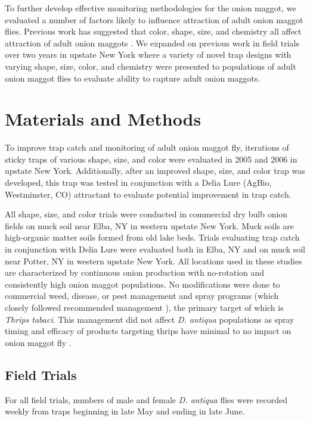 \documentclass[alpha-refs]{wiley-article}
\begin{document}
To further develop effective monitoring methodologies for the onion maggot, we evaluated a number of factors likely to influence attraction of adult onion maggot flies.  Previous work has suggested that color, shape, size, and chemistry all affect attraction of adult onion maggots \citep{harris1983color,harris1988host, thomingdeveloping, otto2000development}. We expanded on previous work in field trials over two years in upstate New York where a variety of novel trap designs with varying shape, size, color, and chemistry were presented to populations of adult onion maggot flies to evaluate ability to capture adult onion maggots.  

\section{Materials and Methods}

To improve trap catch and monitoring of adult onion maggot fly, iterations of sticky traps of various shape, size, and color were evaluated in 2005 and 2006 in upstate New York.  Additionally, after an improved shape, size, and color trap was developed, this trap was tested in conjunction with a Delia Lure (AgBio, Westminster, CO) attractant to evaluate potential improvement in trap catch.  

All shape, size, and color trials were conducted in commercial dry bulb onion fields on muck soil near Elba, NY in western upstate New York. Muck soils are high-organic matter soils formed from old lake beds.  Trials evaluating trap catch in conjunction with Delia Lure were evaluated both in Elba, NY and on muck soil near Potter, NY in western upstate New York.  All locations used in these studies are characterized by continuous onion production with no-rotation and consistently high onion maggot populations.  No modifications were done to commercial weed, disease, or pest management and spray programs (which closely followed recommended management \citep{reiners2019}), the primary target of which is \textit{Thrips tabaci}. This management did not affect \textit{D. antiqua} populations as spray timing and efficacy of products targeting thrips have minimal to no impact on onion maggot fly \citep{finch1986behavior}. 

\subsection{Field Trials}

For all field trials, numbers of male and female \textit{D. antiqua} flies were recorded weekly from traps beginning in late May and ending in late June. 
\end{document}
